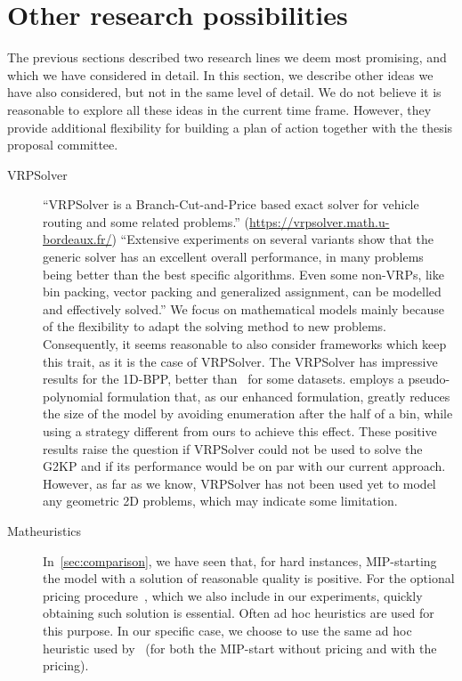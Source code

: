 \section{Other research possibilities}
\label{sec:alternatives}

The previous sections described two research lines we deem most promising, and which we have considered in detail.
In this section, we describe other ideas we have also considered, but not in the same level of detail.
We do not believe it is reasonable to explore all these ideas in the current time frame.
However, they provide additional flexibility for building a plan of action together with the thesis proposal committee.

\begin{description}
\item[VRPSolver]
	``VRPSolver is a Branch-Cut-and-Price based exact solver for vehicle routing and some related problems.'' (\url{https://vrpsolver.math.u-bordeaux.fr/})
	``Extensive experiments on several variants show that the generic solver has an excellent overall performance, in many problems being better than the best specific algorithms. Even some non-VRPs, like bin packing, vector packing and generalized assignment, can be modelled and effectively solved.'' \citep{pessoa:2020}
	We focus on mathematical models mainly because of the flexibility to adapt the solving method to new problems.
	Consequently, it seems reasonable to also consider frameworks which keep this trait, as it is the case of VRPSolver.
	The VRPSolver has impressive results for the 1D-BPP, better than~\citet{delorme:2019} for some datasets.
	\citet{delorme:2019} employs a pseudo-polynomial formulation that, as our enhanced formulation, greatly reduces the size of the model by avoiding enumeration after the half of a bin, while using a strategy different from ours to achieve this effect.
	These positive results raise the question if VRPSolver could not be used to solve the G2KP and if its performance would be on par with our current approach.
	However, as far as we know, VRPSolver has not been used yet to model any geometric 2D problems, which may indicate some limitation.
\item[Matheuristics]
	In~\cref{sec:comparison}, we have seen that, for hard instances, MIP-starting the model with a solution of reasonable quality is positive.
	For the optional pricing procedure~\citet{furini:2016}, which we also include in our experiments, quickly obtaining such solution is essential.
	Often ad hoc heuristics are used for this purpose.
	In our specific case, we choose to use the same ad hoc heuristic used by~\citet{furini:2016} (for both the MIP-start without pricing and with the pricing).

\end{description}

